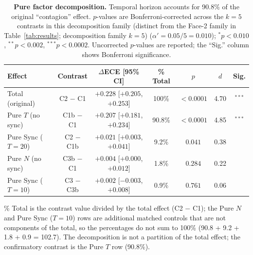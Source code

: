 \documentclass[11pt]{article}
\begin{document}
\begin{table}[H]
\centering
\caption{\textbf{Pure factor decomposition.} Temporal horizon accounts for 90.8\% of the original ``contagion'' effect. $p$-values are Bonferroni-corrected across the $k{=}5$ contrasts in this decomposition family (distinct from the Face-2 family in Table~\ref{tab:results}; decomposition family $k{=}5$) ($\alpha' = 0.05/5 = 0.010$); $^{*}p<0.010$, $^{**}p<0.002$, $^{***}p<0.0002$. Uncorrected $p$-values are reported; the ``Sig.'' column shows Bonferroni significance.}
\label{tab:decomp}
\begin{tabular}{@{}lcccccc@{}}
\toprule
Effect & Contrast & $\Delta$ECE [95\% CI] & \% Total & $p$ & $d$ & Sig. \\
\midrule
Total (original) & C2 $-$ C1 & $+0.228$ [$+0.205$, $+0.253$] & 100\% & $<0.0001$ & 4.70 & $^{***}$ \\
Pure $T$ (no sync) & C1b $-$ C1 & $+0.207$ [$+0.181$, $+0.234$] & 90.8\% & $<0.0001$ & 4.85 & $^{***}$ \\
Pure Sync ($T{=}20$) & C2 $-$ C1b & $+0.021$ [$+0.003$, $+0.041$] & 9.2\% & $0.041$ & 0.38 & \\
Pure $N$ (no sync) & C3b $-$ C1 & $+0.004$ [$+0.000$, $+0.012$] & 1.8\% & $0.284$ & 0.22 & \\
Pure Sync ($T{=}10$) & C3 $-$ C3b & $+0.002$ [$-0.003$, $+0.008$] & 0.9\% & $0.761$ & 0.06 & \\
\bottomrule
\end{tabular}
\smallskip
{\footnotesize \% Total is the contrast value divided by the total effect (C2 $-$ C1); the Pure $N$ and Pure Sync ($T{=}10$) rows are additional matched controls that are not components of the total, so the percentages do not sum to 100\% (90.8 + 9.2 + 1.8 + 0.9 = 102.7). The decomposition is not a partition of the total effect; the confirmatory contrast is the Pure $T$ row (90.8\%).}
\end{table}
\end{document}
